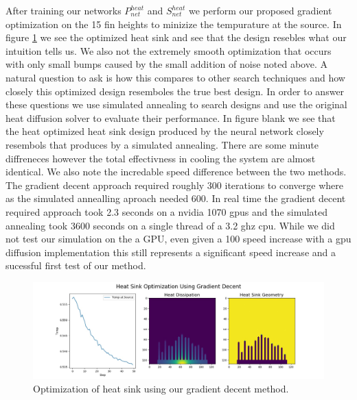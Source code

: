 \documentclass{article} %
\begin{document}
After training our networks $P^{heat}_{net}$ and $S^{heat}_{net}$ we perform our proposed gradient optimization on the 15 fin heights to minizize the tempurature at the source. In figure \ref{heat_sink_optimization} we see the optimized heat sink and see that the design resebles what our intuition tells us. We also not the extremely smooth optimization that occurs with only small bumps caused by the small addition of noise noted above. A natural question to ask is how this compares to other search techniques and how closely this optimized design resemboles the true best design. In order to answer these questions we use simulated annealing to search designs and use the original heat diffusion solver to evaluate their performance. In figure blank we see that the heat optimized heat sink design produced by the neural network closely resembols that produces by a simulated annealing. There are some minute diffreneces however the total effectivness in cooling the system are almost identical. We also note the incredable speed difference between the two methods. The gradient decent approach required roughly 300 iterations to converge where as the simulated annealling aproach needed 600. In real time the gradient decent required approach took 2.3 seconds on a nvidia 1070 gpus and the simulated annealing took 3600 seconds on a single thread of a 3.2 ghz cpu. While we did not test our simulation on the a GPU, even given a 100 speed increase with a gpu diffusion implementation this still represents a significant speed increase and a sucessful first test of our method.

\begin{figure}[!t]
\begin{center}
\includegraphics[scale=0.27]{../test/figs/heat_learn_gradient_decent.jpeg}
\end{center}
\caption{Optimization of heat sink using our gradient decent method.}
\label{heat_sink_optimization}
\end{figure}
\end{document}
